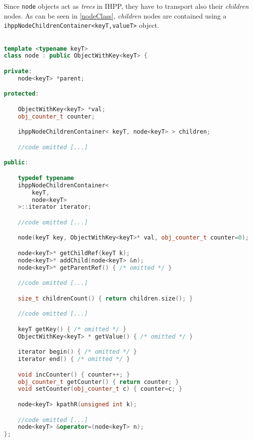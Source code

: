 \documentclass[a4paper,10pt]{report}
\begin{document}
Since \verb|node| objects act as \emph{trees} in IHPP, they have to transport
also their \emph{children} nodes. As can be seen in \cref{nodeClass},
\emph{children} nodes are contained using a
\verb|ihppNodeChildrenContainer<keyT,valueT>| object.

\begin{lstlisting}[language=C++,
	caption={partial definition of \texttt{node<keyT>} class},
	label=nodeClass, frame=leftline]

template <typename keyT>
class node : public ObjectWithKey<keyT> {

private:
	node<keyT> *parent;

protected:

	ObjectWithKey<keyT> *val;
	obj_counter_t counter;

	ihppNodeChildrenContainer< keyT, node<keyT> > children;

	//code omitted [...]

public:

	typedef typename
	ihppNodeChildrenContainer<
		keyT,
        node<keyT>
    >::iterator iterator;

	//code omitted [...]

	node(keyT key, ObjectWithKey<keyT>* val, obj_counter_t counter=0);

	node<keyT>* getChildRef(keyT k);
	node<keyT>* addChild(node<keyT> &n);
	node<keyT>* getParentRef() { /* omitted */ }

	//code omitted [...]

	size_t childrenCount() { return children.size(); }

	//code omitted [...]

	keyT getKey() { /* omitted */ }
	ObjectWithKey<keyT> * getValue() { /* omitted */ }

	iterator begin() { /* omitted */ }
	iterator end() { /* omitted */ }

	void incCounter() { counter++; }
	obj_counter_t getCounter() { return counter; }
	void setCounter(obj_counter_t c) { counter=c; }

	node<keyT> kpathR(unsigned int k);

	//code omitted [...]
	node<keyT> &operator=(node<keyT> n);
};

\end{lstlisting}
\end{document}
